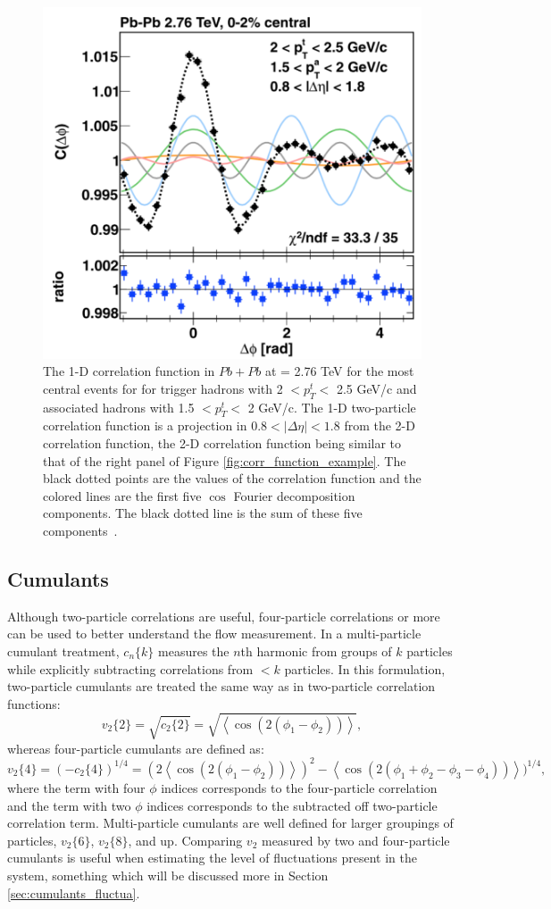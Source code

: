 \begin{figure}[!ht]
\begin{center}
\includegraphics[width=0.48\linewidth]{figs/1d_correlation_function_with_fourier.png}
\caption{The 1-D correlation function in $Pb+Pb$ at \sqsn = 2.76 TeV for the most central events for for trigger hadrons with 2 $<p_T^t<$ 2.5 GeV/c and associated hadrons with 1.5 $<p_T^t<$ 2 GeV/c. The 1-D two-particle correlation function is a projection in $0.8 < |\Delta\eta| < 1.8$ from the 2-D correlation function, the 2-D correlation function being similar to that of the right panel of Figure \ref{fig:corr_function_example}. The black dotted points are the values of the correlation function and the colored lines are the first five $\cos$ Fourier decomposition  components. The black dotted line is the sum of these five components~\cite{Aamodt2012249}.}
\label{fig:1d_corr_function_example_fourier}
\end{center}
\end{figure}

\subsection{Cumulants}
Although two-particle correlations are useful, four-particle correlations or more can be used to better understand the flow measurement. In a multi-particle cumulant treatment, $c_n\{k\}$ measures the $n$th harmonic from groups of $k$ particles while explicitly subtracting correlations from $< k$ particles. In this formulation, two-particle cumulants are treated the same way as in two-particle correlation functions:
\begin{equation}
v_2\{2\} = \sqrt{c_2\{2\}} = \sqrt{\left<\cos(2(\phi_1-\phi_2))\right>},
\label{eqn:v22}
\end{equation}
whereas four-particle cumulants are defined as:
\begin{equation}
v_2\{4\} = (-c_2\{4\})^{1/4} =  (2\left<\cos(2(\phi_1-\phi_2))\right>)^2 - \left<\cos(2(\phi_1 + \phi_2 - \phi_3 - \phi_4))\right>)^{1/4},
\label{eqn:v24}
\end{equation}
where the term with four $\phi$ indices corresponds to the four-particle correlation and the term with two $\phi$ indices corresponds to the subtracted off two-particle correlation term. Multi-particle cumulants are well defined for larger groupings of particles, $v_2\{6\}$, $v_2\{8\}$, and up. Comparing $v_2$ measured by two and four-particle cumulants is useful when estimating the level of fluctuations present in the system, something which will be discussed more in Section \ref{sec:cumulants_fluctua}.
